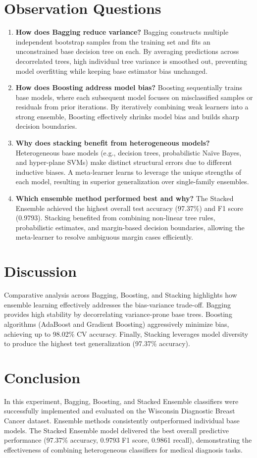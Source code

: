 \documentclass[12pt,a4paper]{article}
\begin{document}
\section{Observation Questions}
\begin{enumerate}
\item \textbf{How does Bagging reduce variance?} Bagging constructs multiple independent bootstrap samples from the training set and fits an unconstrained base decision tree on each. By averaging predictions across decorrelated trees, high individual tree variance is smoothed out, preventing model overfitting while keeping base estimator bias unchanged.
\item \textbf{How does Boosting address model bias?} Boosting sequentially trains base models, where each subsequent model focuses on misclassified samples or residuals from prior iterations. By iteratively combining weak learners into a strong ensemble, Boosting effectively shrinks model bias and builds sharp decision boundaries.
\item \textbf{Why does stacking benefit from heterogeneous models?} Heterogeneous base models (e.g., decision trees, probabilistic Na\"ive Bayes, and hyper-plane SVMs) make distinct structural errors due to different inductive biases. A meta-learner learns to leverage the unique strengths of each model, resulting in superior generalization over single-family ensembles.
\item \textbf{Which ensemble method performed best and why?} The Stacked Ensemble achieved the highest overall test accuracy (97.37\%) and F1 score (0.9793). Stacking benefited from combining non-linear tree rules, probabilistic estimates, and margin-based decision boundaries, allowing the meta-learner to resolve ambiguous margin cases efficiently.
\end{enumerate}

\section{Discussion}
Comparative analysis across Bagging, Boosting, and Stacking highlights how ensemble learning effectively addresses the bias-variance trade-off. Bagging provides high stability by decorrelating variance-prone base trees. Boosting algorithms (AdaBoost and Gradient Boosting) aggressively minimize bias, achieving up to 98.02\% CV accuracy. Finally, Stacking leverages model diversity to produce the highest test generalization (97.37\% accuracy).

\section{Conclusion}
In this experiment, Bagging, Boosting, and Stacked Ensemble classifiers were successfully implemented and evaluated on the Wisconsin Diagnostic Breast Cancer dataset. Ensemble methods consistently outperformed individual base models. The Stacked Ensemble model delivered the best overall predictive performance (97.37\% accuracy, 0.9793 F1 score, 0.9861 recall), demonstrating the effectiveness of combining heterogeneous classifiers for medical diagnosis tasks.
\end{document}
